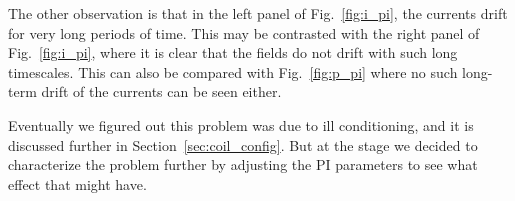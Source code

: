 The other observation is that in the left panel of
Fig.~\ref{fig:i_pi}, the currents drift for very long periods of time.
This may be contrasted with the right panel of Fig.~\ref{fig:i_pi},
where it is clear that the fields do not drift with such long
timescales.  This can also be compared with Fig.~\ref{fig:p_pi} where
no such long-term drift of the currents can be seen either.

Eventually we figured out this problem was due to ill conditioning,
and it is discussed further in Section~\ref{sec:coil_config}.  But at the
stage we decided to characterize the problem further by adjusting the
PI parameters to see what effect that might have.


%



